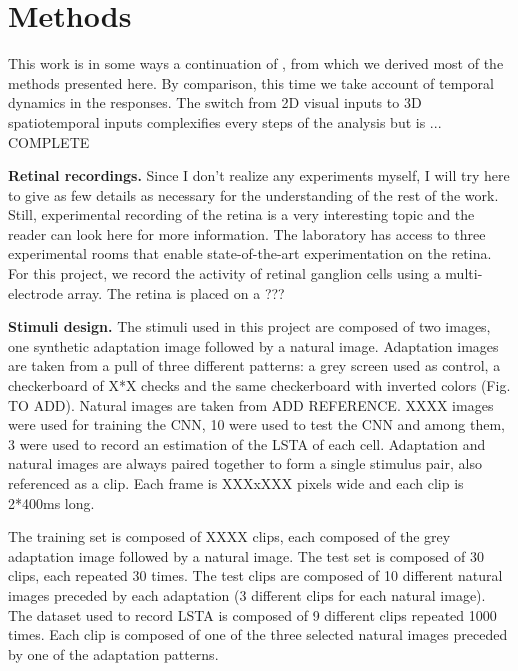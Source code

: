 \section{Methods}\label{sec:methods}

This work is in some ways a continuation of
\cite{goldin_context-dependent_2022}, from which we derived most of the methods
presented here. By comparison, this time we take account of temporal dynamics
in the responses. The switch from 2D visual inputs to 3D spatiotemporal inputs
complexifies every steps of the analysis but is ... COMPLETE

\textbf{Retinal recordings.}
Since I don't realize any experiments myself, I will try here to give as few
details
as necessary for the understanding of the rest of the work. Still, experimental
recording of the retina is a very interesting topic and the reader can look
here for more information. %
The laboratory has access to three experimental rooms that enable
state-of-the-art experimentation
on the retina.	For this project, we record the activity of retinal ganglion
cells
using a multi-electrode array. The retina is placed on a ???


\textbf{Stimuli design.}
The stimuli used in this project are composed of two images, one synthetic
adaptation image followed by a natural image. Adaptation images are taken from
a pull of three different patterns: a grey screen used as control, a
checkerboard of X*X checks and the same checkerboard with inverted colors (Fig.
TO ADD). Natural images are taken from ADD REFERENCE. XXXX images were used for
training the CNN, 10 were used to test the CNN and among them, 3 were used to
record an estimation of the LSTA of each cell.
Adaptation and natural images are always paired together to form a single
stimulus pair, also referenced as a clip. Each frame is XXXxXXX pixels wide and
each clip is 2*400ms long.


The training set is composed of XXXX clips, each composed of the grey
adaptation image followed by a natural image. The test set is composed of 30
clips, each repeated 30 times. The test clips are composed of 10 different
natural
images preceded by each adaptation (3 different clips for each natural image).
The dataset used to record LSTA is composed of 9 different clips repeated 1000
times. Each clip is composed of one of the three selected natural images
preceded by one of the adaptation patterns.

